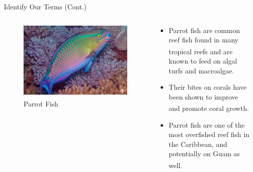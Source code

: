 \documentclass{beamer}
\begin{document}
\begin{frame}{Identify Our Terms (Cont.)}
    \begin{columns}
        \begin{column}{0.5\textwidth}
            \begin{figure}
                \centering
                \includegraphics[width=1\textwidth]{Latex/Figures/parrot_fish.jpg}
                \caption{Parrot Fish\textsuperscript{\cite{img_parrot_fish}}}
                \label{fig:my_label}
            \end{figure}
        \end{column}
        \begin{column}{0.5\textwidth}
            \begin{itemize}
                \item Parrot fish are common reef fish found in many tropical reefs\textsuperscript{\cite{13_blackwood_hastings_mumby_2010}} and are known to feed on algal turfs and macroalgae.
                \item Their bites on corals have been shown to improve and promote coral growth\textsuperscript{\cite{mcdermott_2021}}.
                \item Parrot fish are one of the most overfished reef fish in the Caribbean, and potentially on Guam as well\textsuperscript{\cite{13_blackwood_hastings_mumby_2010}}.
            \end{itemize}
        \end{column}
    \end{columns}
\end{frame}


\end{document}
